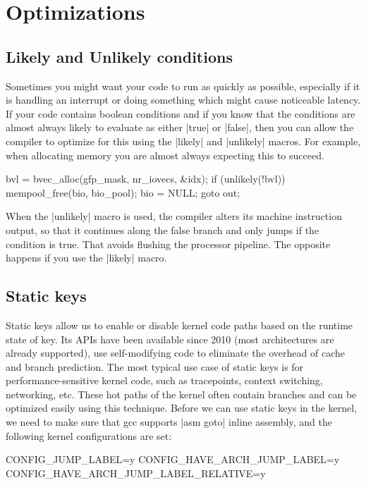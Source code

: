 \documentclass[10pt, oneside]{book}
\begin{document}

\section{Optimizations}
\label{sec:optimization}
\subsection{Likely and Unlikely conditions}
\label{sec:likely_unlikely}
Sometimes you might want your code to run as quickly as possible, especially if it is handling an interrupt or doing something which might cause noticeable latency.
If your code contains boolean conditions and if you know that the conditions are almost always likely to evaluate as either \cpp|true| or \cpp|false|,
then you can allow the compiler to optimize for this using the \cpp|likely| and \cpp|unlikely| macros.
For example, when allocating memory you are almost always expecting this to succeed.

\begin{code}
bvl = bvec_alloc(gfp_mask, nr_iovecs, &idx);
if (unlikely(!bvl)) {
    mempool_free(bio, bio_pool);
    bio = NULL;
    goto out;
}
\end{code}

When the \cpp|unlikely| macro is used, the compiler alters its machine instruction output, so that it continues along the false branch and only jumps if the condition is true.
That avoids flushing the processor pipeline.
The opposite happens if you use the \cpp|likely| macro.

\subsection{Static keys}
\label{sec:static_keys}
Static keys allow us to enable or disable kernel code paths based on the runtime state of key. Its APIs have been available since 2010 (most architectures are already supported), use self-modifying code to eliminate the overhead of cache and branch prediction.
The most typical use case of static keys is for performance-sensitive kernel code, such as tracepoints, context switching, networking, etc. These hot paths of the kernel often contain branches and can be optimized easily using this technique.
Before we can use static keys in the kernel, we need to make sure that gcc supports \cpp|asm goto| inline assembly, and the following kernel configurations are set:

\begin{code}
CONFIG_JUMP_LABEL=y
CONFIG_HAVE_ARCH_JUMP_LABEL=y
CONFIG_HAVE_ARCH_JUMP_LABEL_RELATIVE=y
\end{code}
\end{document}
